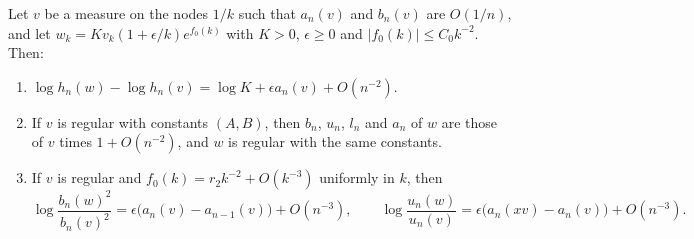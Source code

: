 \begin{proposition}[Transfer]\label{prop:pone-transfer}
Let $v$ be a measure on the nodes $1/k$ such that $a_n(v)$ and $b_n(v)$ are $O(1/n)$, and let
$w_k=Kv_k(1+\epsilon/k)e^{f_0(k)}$ with $K>0$, $\epsilon\ge0$ and $|f_0(k)|\le C_0k^{-2}$. Then:
\begin{enumerate}
\item[(i)] $\log h_n(w)-\log h_n(v)=\log K+\epsilon a_n(v)+O(n^{-2})$.
\item[(ii)] If $v$ is regular with constants $(A,B)$, then $b_n$, $u_n$, $l_n$ and $a_n$ of $w$ are those of $v$ times
  $1+O(n^{-2})$, and $w$ is regular with the same constants.
\item[(iii)] If $v$ is regular and $f_0(k)=r_2k^{-2}+O(k^{-3})$ uniformly in $k$, then
  \[
    \log\frac{b_n(w)^2}{b_n(v)^2}=\epsilon\bigl(a_n(v)-a_{n-1}(v)\bigr)+O(n^{-3}),\qquad
    \log\frac{u_n(w)}{u_n(v)}=\epsilon\bigl(a_n(xv)-a_n(v)\bigr)+O(n^{-3}).
  \]
\end{enumerate}
\end{proposition}

